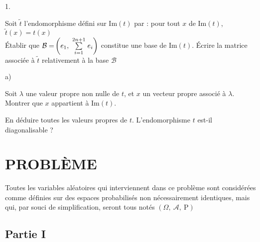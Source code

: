 \documentclass[11pt]{article}%
\begin{document}
\begin{noliste}{1.}
\item Soit $\tilde{t}$ l'endomorphisme défini sur $\mathrm{Im}\left(
t\right) $ par : pour tout $x$ de $\mathrm{Im}\left( t\right) $,
$\tilde{t}\left( x\right) = t\left( x\right) $\\
Établir que $\mathcal{B = }\left( e_{1},\ \Sum{i = 1}{2n +
1}e_{i}\right) $
constitue une base de $\mathrm{Im}\left( t\right) $. Écrire la matrice
associée à $\tilde{t}$ relativement à la base $\mathcal{B}$

\item 
\begin{noliste}{a)}
 \setlength{\itemsep}{2mm}
\item Soit $\lambda $ une valeur propre non nulle de $t$, et $x$ un
vecteur
propre associé à $\lambda $. Montrer que $x$ appartient à
$\mathrm{Im}\left( t\right) $.

\item En déduire toutes les valeurs propres de $t$. L'endomorphisme $t$
est-il diagonalisable ?
\end{noliste}
\end{noliste}

\section*{PROBL\`{E}ME}

Toutes les variables aléatoires qui interviennent dans ce problème
sont considérées comme définies sur des espaces probabilisés
non nécessairement identiques, mais qui, par souci de simplification,
seront tous notés $\left( \Omega,\ \mathcal{A},\ \mathrm{P}\right) $

\subsection*{Partie I}
\end{document}
